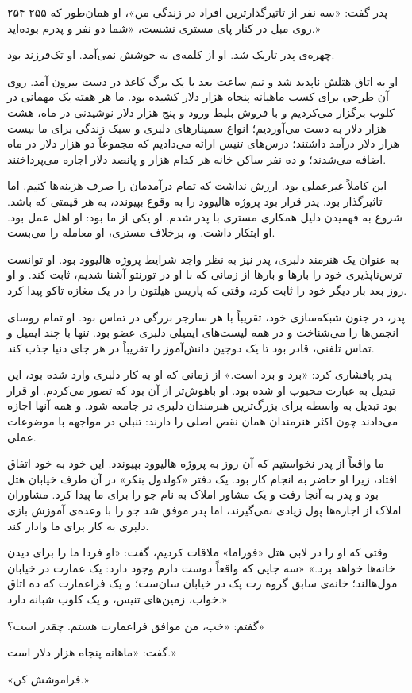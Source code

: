 ۲۵۴  
۲۵۵  
پدر گفت: «سه نفر از تاثیرگذارترین افراد در زندگی من»، او همان‌طور که روی مبل در کنار پای مستری نشست، «شما دو نفر و پدرم بوده‌اید.»

چهره‌ی پدر تاریک شد. او از کلمه‌ی نه خوشش نمی‌آمد. او تک‌فرزند بود.

او به اتاق هتلش ناپدید شد و نیم ساعت بعد با یک برگ کاغذ در دست بیرون آمد. روی آن طرحی برای کسب ماهیانه پنجاه هزار دلار کشیده بود. ما هر هفته یک مهمانی در کلوب برگزار می‌کردیم و با فروش بلیط ورود و پنج هزار دلار نوشیدنی در ماه، هشت هزار دلار به دست می‌آوردیم؛ انواع سمینارهای دلبری و سبک زندگی برای ما بیست هزار دلار درآمد داشتند؛ درس‌های تنیس ارائه می‌دادیم که مجموعاً دو هزار دلار در ماه اضافه می‌شدند؛ و ده نفر ساکن خانه هر کدام هزار و پانصد دلار اجاره می‌پرداختند.

این کاملاً غیرعملی بود. ارزش نداشت که تمام درآمدمان را صرف هزینه‌ها کنیم. اما تاثیرگذار بود. پدر قرار بود پروژه هالیوود را به وقوع بپیوندد، به هر قیمتی که باشد. شروع به فهمیدن دلیل همکاری مستری با پدر شدم. او یکی از ما بود: او اهل عمل بود. او ابتکار داشت. و، برخلاف مستری، او معامله را می‌بست.

به عنوان یک هنرمند دلبری، پدر نیز به نظر واجد شرایط پروژه هالیوود بود. او توانست ترس‌ناپذیری خود را بارها و بارها از زمانی که با او در تورنتو آشنا شدیم، ثابت کند. و او روز بعد بار دیگر خود را ثابت کرد، وقتی که پاریس هیلتون را در یک مغازه تاکو پیدا کرد.

پدر، در جنون شبکه‌سازی خود، تقریباً با هر سارجر بزرگی در تماس بود. او تمام روسای انجمن‌ها را می‌شناخت و در همه لیست‌های ایمیلی دلبری عضو بود. تنها با چند ایمیل و تماس تلفنی، قادر بود تا یک دوجین دانش‌آموز را تقریباً در هر جای دنیا جذب کند.

پدر پافشاری کرد: «برد و برد است.» از زمانی که او به کار دلبری وارد شده بود، این تبدیل به عبارت محبوب او شده بود. او باهوش‌تر از آن بود که تصور می‌کردم. او قرار بود تبدیل به واسطه برای بزرگ‌ترین هنرمندان دلبری در جامعه شود. و همه آنها اجازه می‌دادند چون اکثر هنرمندان همان نقص اصلی را دارند: تنبلی در مواجهه با موضوعات عملی.

ما واقعاً از پدر نخواستیم که آن روز به پروژه هالیوود بپیوندد. این خود به خود اتفاق افتاد، زیرا او حاضر به انجام کار بود. یک دفتر «کولدول بنکر» در آن طرف خیابان هتل بود و پدر به آنجا رفت و یک مشاور املاک به نام جو را برای ما پیدا کرد. مشاوران املاک از اجاره‌ها پول زیادی نمی‌گیرند، اما پدر موفق شد جو را با وعده‌ی آموزش بازی دلبری به کار برای ما وادار کند.

وقتی که او را در لابی هتل «فوراما» ملاقات کردیم، گفت: «او فردا ما را برای دیدن خانه‌ها خواهد برد.» «سه جایی که واقعاً دوست دارم وجود دارد: یک عمارت در خیابان مول‌هالند؛ خانه‌ی سابق گروه رت پک در خیابان سان‌ست؛ و یک فراعمارت که ده اتاق خواب، زمین‌های تنیس، و یک کلوب شبانه دارد.»

گفتم: «خب، من موافق فراعمارت هستم. چقدر است؟»

گفت: «ماهانه پنجاه هزار دلار است.»

«فراموشش کن.»